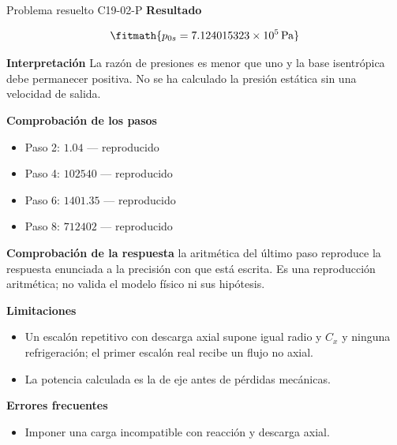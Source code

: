 \documentclass[10pt,openany]{book}
\begin{document}
\begin{studiumworked}{Problema resuelto C19-02-P}
\noindent\textbf{Resultado}

\[
\fitmath{p_{0s}=7.124015323\times10^{5}\,\mathrm{Pa}}
\]

\noindent\textbf{Interpretación}
La razón de presiones es menor que uno y la base isentrópica debe permanecer positiva. No se ha calculado la presión estática sin una velocidad de salida.

\noindent\textbf{Comprobación de los pasos}
\begin{itemize}
\item Paso 2: $1.04$ — reproducido
\item Paso 4: $102540$ — reproducido
\item Paso 6: $1401.35$ — reproducido
\item Paso 8: $712402$ — reproducido
\end{itemize}

\noindent\textbf{Comprobación de la respuesta} la aritmética del último paso reproduce la respuesta enunciada a la precisión con que está escrita. Es una reproducción aritmética; no valida el modelo físico ni sus hipótesis.

\noindent\textbf{Limitaciones}
\begin{itemize}
\item Un escalón repetitivo con descarga axial supone igual radio y $C_x$ y ninguna refrigeración; el primer escalón real recibe un flujo no axial.
\item La potencia calculada es la de eje antes de pérdidas mecánicas.
\end{itemize}

\noindent\textbf{Errores frecuentes}
\begin{itemize}
\item Imponer una carga incompatible con reacción y descarga axial.
\end{itemize}
\begin{center}\end{center}
\end{studiumworked}
\end{document}
